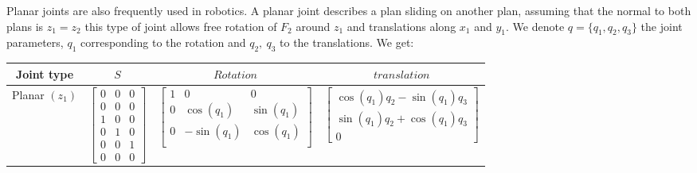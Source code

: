 Planar joints are also frequently used in robotics.
A planar joint describes a plan sliding on another plan, assuming that the normal to both plans is $z_1 = z_2$ this type of joint allows free rotation of $F_2$ around $z_1$ and translations along $x_1$ and $y_1$.
We denote $q = \{q_1, q_2, q_3\}$ the joint parameters, $q_1$ corresponding to the rotation and $q_2,\ q_3$ to the translations.
We get:

\begin{table} [ht]
\centering
\begin{tabular}{cccc}
  \toprule
  Joint type & $S$ & $Rotation$ & $translation$ \\
  \midrule
  Planar $(z_1)$
  &
  $\begin{bmatrix}
    0 & 0 & 0 \\ 0 & 0 & 0 \\ 1 & 0 & 0 \\ 0 & 1 & 0 \\ 0 & 0 & 1 \\ 0 & 0 & 0
  \end{bmatrix}$
  &
  $\begin{bmatrix}
    1 & 0 & 0 \\
    0 & \cos(q_1) & \sin(q_1) \\
    0 & -\sin(q_1) & \cos(q_1) \\
  \end{bmatrix}$
  &
  $\begin{bmatrix}
    \cos(q_1)q_2 - \sin(q_1)q_3 \\ \sin(q_1)q_2 + \cos(q_1)q_3 \\ 0
  \end{bmatrix}$
  \\
  \bottomrule
\end{tabular}
\end{table}

